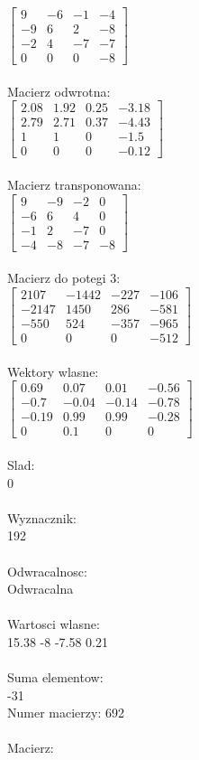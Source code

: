 \documentclass[a4paper,12pt]{article}
\begin{document}
$\begin{bmatrix} 9&-6&-1&-4\\-9&6&2&-8\\-2&4&-7&-7\\0&0&0&-8 \end{bmatrix}$
\\
\\
Macierz odwrotna:\\

$\begin{bmatrix} 2.08&1.92&0.25&-3.18\\2.79&2.71&0.37&-4.43\\1&1&0&-1.5\\0&0&0&-0.12 \end{bmatrix}$
\\
\\
Macierz transponowana:\\

$\begin{bmatrix} 9&-9&-2&0\\-6&6&4&0\\-1&2&-7&0\\-4&-8&-7&-8 \end{bmatrix}$
\\
\\
Macierz do potegi 3:\\

$\begin{bmatrix} 2107&-1442&-227&-106\\-2147&1450&286&-581\\-550&524&-357&-965\\0&0&0&-512 \end{bmatrix}$
\\
\\
Wektory wlasne:\\

$\begin{bmatrix} 0.69&0.07&0.01&-0.56\\-0.7&-0.04&-0.14&-0.78\\-0.19&0.99&0.99&-0.28\\0&0.1&0&0 \end{bmatrix}$
\\
\\
Slad:\\
0
\\
\\
Wyznacznik:\\
192
\\
\\
Odwracalnosc:\\
Odwracalna
\\
\\
Wartosci wlasne:\\
15.38 -8 -7.58 0.21
\\
\\
Suma elementow:\\
-31
\\
\newpage
Numer macierzy:
692
\\
\\
Macierz:\\
\end{document}
